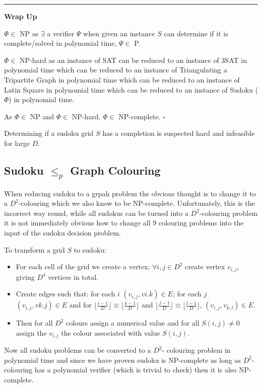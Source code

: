 \documentclass[a4paper,11pt]{report}
\newcounter{col}
\begin{document}
\noindent\rule{4cm}{0.4pt}

\textbf{Wrap Up} 

$\Phi\in $ NP as $\exists$ a verifier $\Psi$ when given an instance $S$ can determine if it is complete/solved in polynomial time, $\Psi\in$ P.

$\Phi\in $ NP-hard as an instance of SAT can be reduced to an instance of 3SAT in polynomial time which can be reduced to an instance of Triangulating a Tripartite Graph in polynomial time which can be reduced to an instance of Latin Square in polynomial time which can be reduced to an instance of Sudoku ($\Phi$) in polynomial time.

As $\Phi\in$ NP and $\Phi\in$ NP-hard, $\Phi\in$ NP-complete. $\square$

Determining if a sudoku grid $S$ has a completion is suspected hard and infeasible for large $D$.

\subsection{Sudoku $\leq_p$  Graph Colouring}

When reducing sudoku to a grpah problem the obvious thought is to change it to a $D^2$-colouring which we also know to be NP-complete. Unfortunately, this is the incorrect way round, while all sudokus can be turned into a $D^2$-colouring problem it is not immediately obvious how to change all 9 colouring problems into the input of the sudoku decision problem. 

To transform a grid $S$ to sudoku:
\begin{itemize}
\item For each cell of the grid we create a vertex; $\forall i,j\in D^2$ create vertex $v_{i,j}$, giving $D^4$ vertices in total.
\item Create edges such that: for each $i$ $(v_{i,j},v{i.k})\in E$; for each $j$ $(v_{i,j},v{k.j})\in E$ and for $\lfloor\frac{i-1}{D}\rfloor\equiv\lfloor\frac{k-1}{D}\rfloor$ and $\lfloor\frac{j-1}{D}\rfloor\equiv\lfloor\frac{l-1}{D}\rfloor$, $(v_{i,j},v_{k,l})\in E$.
\item Then for all $D^2$ colours assign a numerical value and for all $S(i,j)\neq 0$ assign the $v_{i,j}$ the colour associated with value $S(i,j)$.
\end{itemize}

Now all sudoku problems can be converted to a $D^2$- colouring problem in polynomial time and since we have proven sudoku is NP-complete as long as $D^2$- colouring has a polynomial verifier (which is trivial to check) then it is also NP-complete.  
\end{document}
